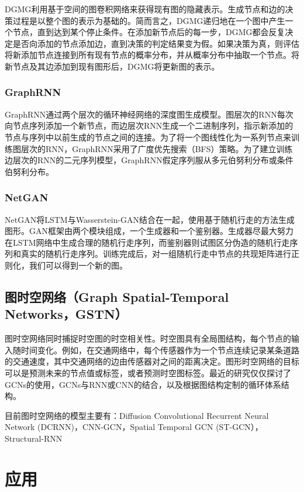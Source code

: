 \documentclass[UTF8]{ctexart}
\begin{document}
DGMG利用基于空间的图卷积网络来获得现有图的隐藏表示。生成节点和边的决策过程是以整个图的表示为基础的。简而言之，DGMG递归地在一个图中产生一个节点，直到达到某个停止条件。在添加新节点后的每一步，DGMG都会反复决定是否向添加的节点添加边，直到决策的判定结果变为假。如果决策为真，则评估将新添加节点连接到所有现有节点的概率分布，并从概率分布中抽取一个节点。将新节点及其边添加到现有图形后，DGMG将更新图的表示。

\subsubsection{GraphRNN}
GraphRNN通过两个层次的循环神经网络的深度图生成模型。图层次的RNN每次向节点序列添加一个新节点，而边层次RNN生成一个二进制序列，指示新添加的节点与序列中以前生成的节点之间的连接。为了将一个图线性化为一系列节点来训练图层次的RNN，GraphRNN采用了广度优先搜索（BFS）策略。为了建立训练边层次的RNN的二元序列模型，GraphRNN假定序列服从多元伯努利分布或条件伯努利分布。

\subsubsection{NetGAN}
NetGAN将LSTM与Wasserstein-GAN结合在一起，使用基于随机行走的方法生成图形。GAN框架由两个模块组成，一个生成器和一个鉴别器。生成器尽最大努力在LSTM网络中生成合理的随机行走序列，而鉴别器则试图区分伪造的随机行走序列和真实的随机行走序列。训练完成后，对一组随机行走中节点的共现矩阵进行正则化，我们可以得到一个新的图。

\subsection{图时空网络（Graph Spatial-Temporal Networks，GSTN）}

图时空网络同时捕捉时空图的时空相关性。时空图具有全局图结构，每个节点的输入随时间变化。例如，在交通网络中，每个传感器作为一个节点连续记录某条道路的交通速度，其中交通网络的边由传感器对之间的距离决定。图形时空网络的目标可以是预测未来的节点值或标签，或者预测时空图标签。最近的研究仅仅探讨了GCNs的使用，GCNs与RNN或CNN的结合，以及根据图结构定制的循环体系结构。 \par
目前图时空网络的模型主要有：Diffusion Convolutional Recurrent Neural Network (DCRNN)，CNN-GCN，Spatial Temporal GCN (ST-GCN），Structural-RNN

\section{应用}
\end{document}
